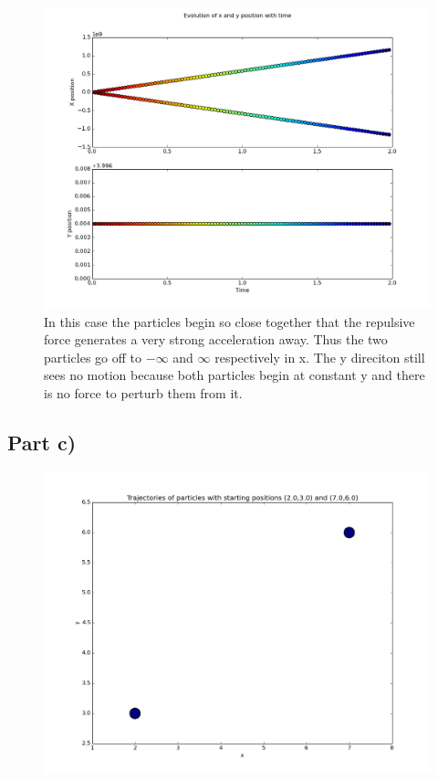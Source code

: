 \documentclass[a4paper,12pt]{article}
\begin{document}
\begin{figure}[H]
\centering
\includegraphics[width = \linewidth]{lab6q5bi.png}
\caption{In this case the particles begin so close together that the repulsive force generates a very strong acceleration away. Thus the two particles go off to $-\infty$ and $\infty$ respectively in x. The y direciton still sees no motion because both particles begin at constant y and there is no force to perturb them from it.}
\label{fig:q5bi}
\end{figure}

\subsection{Part c)}

\begin{figure}[H]
\centering
\includegraphics[width = \linewidth]{lab6q5c.png}
\caption{}
\label{fig:q5c}
\end{figure}
\end{document}
